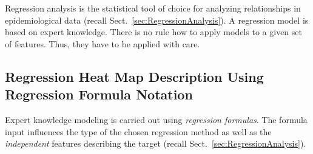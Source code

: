 \documentclass[journal]{style/vgtc} 			          %
\newcommand{\design}[1]{\textcolor{orange}{#1}}
\begin{document}

Regression analysis is the statistical tool of choice for analyzing relationships in epidemiological data (recall Sect.~\ref{sec:RegressionAnalysis}).
A regression model is based on expert knowledge.
There is no rule how to apply models to a given set of features. Thus, they have to be applied with care.
\subsection{Regression Heat Map Description Using Regression Formula Notation}
Expert knowledge modeling is carried out using \emph{regression formulas}.
The formula input influences the type of the chosen regression method as well as the \emph{independent} features describing the target (recall Sect.~\ref{sec:RegressionAnalysis}).
\end{document}
